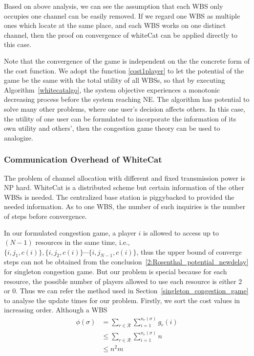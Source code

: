 \documentclass[times]{ettauth}
\newcommand{\ie}{i.e., }
\theoremstyle{mytheoremstyle}
\theoremstyle{mytheoremstyle}
\theoremstyle{mytheoremstyle}
\begin{document}
Based on above analysis, we can see the assumption that each WBS only occupies one channel can be easily removed.
If we regard one WBS as multiple ones which locate at the same place, and each WBS works on one distinct channel, then the proof on convergence of whiteCat can be applied directly to this case.

Note that the convergence of the game is independent on the the concrete form of the cost function. 
We adopt the function \ref{cost1player} to let the potential of the game be the same with the total utility of all WBSs, so that by executing Algorithm~\ref{whitecatalgo}, the system objective experiences a monotonic decreasing process before the system reaching NE.
The algorithm has potential to solve many other problems, where one user's decision affects others.
In this case, the utility of one user can be formulated to incorporate the information of its own utility and others', then the congestion game theory can be used to analogize.



\subsubsection{Communication Overhead of WhiteCat}

The problem of channel allocation with different and fixed transmission power is NP hard.
WhiteCat is a distributed scheme but certain information of the other WBSs is needed.
The centralized base station is piggybacked to provided the needed information.
As to one WBS, the number of such inquiries is the number of steps before convergence.

In our formulated congestion game, a player $i$ is allowed to access up to $(N-1)$ resources in the same time, \ie $\{i, j_1, c(i)\}, \{i, j_2, c(i)\} \cdots \{i, j_{N-1}, c(i)\}$, thus the upper bound of converge steps can not be obtained from the conclusion~\ref{2:Rosenthal_potential_newdelay} for singleton congestion game.
But our problem is special because for each resource, the possible number of players allowed to use each resource is either 2 or 0.
Thus we can refer the method used in Section~\ref{singleton_congestion_game} to analyse the update times for our problem.
Firstly, we sort the cost values in increasing order.
Although a WBS 
\begin{equation}
\label{2:Rosenthal_potential_newdelay}
\begin{split}
\phi(\sigma) 
& =\sum\limits^{}_{r\in \mathcal{R}} \sum\limits^{n_r(\sigma)}_{i=1} g_r(i)\\
& \leq \sum\limits^{}_{r\in \mathcal{R}} \sum\limits^{n_r(\sigma)}_{i=1} n\\
& \leq n^2m
\end{split}
\end{equation}
\end{document}
